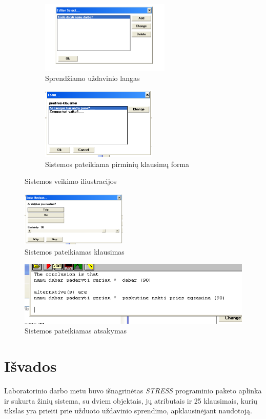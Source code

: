 \documentclass[11pt, a4paper, lithuanian]{article}
\begin{document}
    \begin{figure}
      \centering
      \begin{subfigure}[b]{0.45\textwidth}
        \includegraphics[height=130px]{img/sprendziamas_uzdavinys.png}
        \caption{Sprendžiamo uždavinio langas}
        \label{img:sprendziamas_uzdavinys}
      \end{subfigure}
      \begin{subfigure}[b]{0.45\textwidth}
        \includegraphics[height=130px]{img/forma.png}
        \caption{Sistemos pateikiama pirminių klausimų forma}
        \label{img:pirminiu_klausimu_forma}
      \end{subfigure}
      \caption{Sistemos veikimo iliustracijos}
    \end{figure}

    \begin{figure}
      \centering
      \includegraphics[width=0.45\textwidth]{img/klausimas.png}
      \caption{Sistemos pateikiamas klausimas}
      \label{img:klausimas}
    \end{figure}

    \begin{figure}
      \centering
      \includegraphics[width=\textwidth]{img/atsakymas.png}
      \caption{Sistemos pateikiamas atsakymas}
      \label{img:atsakymas}
    \end{figure}

    \section{Išvados}

    Laboratorinio darbo metu buvo išnagrinėtas \textit{STRESS} programinio paketo aplinka ir sukurta žinių sistema, su dviem objektais, jų atributais ir 25 klausimais, kurių tikslas yra prieiti prie užduoto uždavinio sprendimo, apklausinėjant naudotoją.
\end{document}
